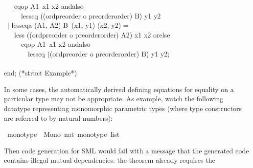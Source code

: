 \begin{isabellebody}
\begin{isamarkuptext}
\hspace*{0pt} ~~~eqop A1{}~x1 x2 andalso\\
\hspace*{0pt} ~~~~~less{}eq ((ord{}preorder o preorder{}order) B{}) y1 y2\\
\hspace*{0pt} ~| less{}eqa (A1{}, A2{}) B{}~(x1, y1) (x2, y2) =\\
\hspace*{0pt} ~~~less ((ord{}preorder o preorder{}order) A2{}) x1 x2 orelse\\
\hspace*{0pt} ~~~~~eqop A1{}~x1 x2 andalso\\
\hspace*{0pt} ~~~~~~~less{}eq ((ord{}preorder o preorder{}order) B{}) y1 y2;\\
\hspace*{0pt}\\
\hspace*{0pt}end; (*struct Example*)%
\end{isamarkuptext}%
\isamarkuptrue%
%
\endisatagquote
{\isafoldquote}%
%
\isadelimquote
%
\endisadelimquote
%
\begin{isamarkuptext}%
In some cases, the automatically derived defining equations
  for equality on a particular type may not be appropriate.
  As example, watch the following datatype representing
  monomorphic parametric types (where type constructors
  are referred to by natural numbers):%
\end{isamarkuptext}%
\isamarkuptrue%
%
\isadelimquote
%
\endisadelimquote
%
\isatagquote
{}\isamarkupfalse%
\ monotype\ {\isacharequal}\ Mono\ nat\ {\isachardoublequoteopen}monotype\ list{\isachardoublequoteclose}%
\endisatagquote
{\isafoldquote}%
%
\isadelimquote
%
\endisadelimquote
%
\isadelimproof
%
\endisadelimproof
%
\isatagproof
%
\endisatagproof
{\isafoldproof}%
%
\isadelimproof
%
\endisadelimproof
%
\begin{isamarkuptext}%
\noindent Then code generation for SML would fail with a message
  that the generated code contains illegal mutual dependencies:
  the theorem  already requires the

\end{isamarkuptext}
\end{isabellebody}
